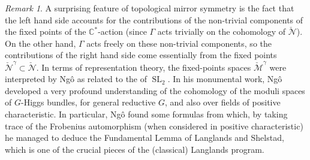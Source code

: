 \documentclass[12pt,a4paper]{amsbook}
\theoremstyle{remark} \newtheorem{rmk}[thm]{Remark}
\theoremstyle{definition} \newtheorem{defn}[thm]{Definition}
\theoremstyle{definition} \newtheorem{ex}[thm]{Example}
\theoremstyle{definition} \newtheorem{ej}{Exercise}
\let\emph\relax
\newcommand{\C}{\mathbb C}
\newcommand{\cM}{\mathcal M}
\newcommand{\cN}{\mathcal N}
\DeclareMathOperator{\SL}{SL}
\begin{document}
\begin{rmk}
A surprising feature of topological mirror symmetry is the fact that the left hand side accounts for the contributions of the non-trivial components of the fixed points of the $\C^*$-action (since $\Gamma$ acts trivially on the cohomology of $\check{\cN}$). On the other hand, $\Gamma$ acts freely on these non-trivial components, so the contributions of the right hand side come essentially from the fixed points $\check{\cN}^\gamma \subset \check{\cN}$. In terms of representation theory, the fixed-points spaces $\check{\cM}^\gamma$ were interpreted by Ngô \cite{Ngo} as related to the \emph{endoscopic subgroups} of $\SL_2$.  In his monumental work, Ngô developed a very profound understanding of the cohomology of the moduli spaces of $G$-Higgs bundles, for general reductive $G$, and also over fields of positive characteristic. In particular, Ngô found some formulas from which, by taking trace of the Frobenius automorphism (when considered in positive characteristic) he managed to deduce the Fundamental Lemma of Langlands and Shelstad, which is one of the crucial pieces of the (classical) Langlands program.
\end{rmk}


\nocite{*}
\printbibliography
\end{document}
